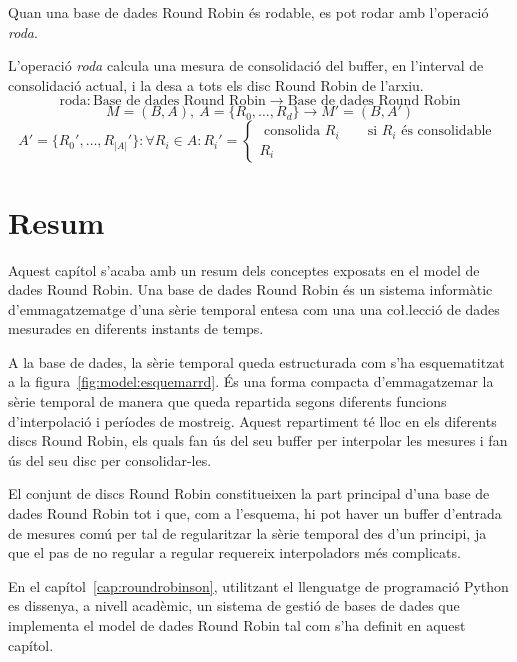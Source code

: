 {Quan una base de dades Round Robin és rodable, es pot rodar amb l'operació \emph{roda}. 
 
\begin{definition}
  L'operació \emph{roda} calcula una mesura de consolidació del
  buffer, en l'interval de consolidació actual, i la desa a tots els
  disc Round Robin de l'arxiu.
  \[
  \text{roda}: \text{Base de dades Round Robin} \longrightarrow
  \text{Base de dades Round Robin}
  \]
  \[
  M=(B,A),\ A = \{R_0,\ldots,R_d\} \longrightarrow M'= (B,A')
  \]
  \[
  A'= \{R_0',\ldots,R_{|A|}'\}: \forall R_i \in A: R_i' =
  \left\{ \begin{array}{l}
      \text{ consolida } R_i \qquad \text{si } R_i \text{ és consolidable }\\
      R_i
    \end{array} \right.
  \]
\end{definition}


\section{Resum}

Aquest capítol s'acaba amb un resum dels conceptes exposats en el model de dades Round Robin. Una base de dades Round Robin és un sistema informàtic d'emmagatzematge d'una sèrie temporal entesa com una  una co\l.lecció de dades mesurades en diferents instants de temps.

A la base de dades, la sèrie temporal queda estructurada com s'ha esquematitzat a  la figura~\ref{fig:model:esquemarrd}. És una forma compacta d'emmagatzemar la sèrie temporal de manera que queda repartida segons diferents funcions d'interpolació i períodes de mostreig. Aquest repartiment té lloc en els diferents discs Round Robin, els quals fan ús del seu buffer per interpolar les mesures i fan ús del seu disc per consolidar-les. 

El conjunt de discs Round Robin constitueixen la part principal d'una base de dades Round Robin tot i que, com a l'esquema, hi pot haver un buffer d'entrada de mesures comú per tal de regularitzar la sèrie temporal des d'un principi, ja que el pas de no regular a regular requereix interpoladors més complicats.


En el capítol~\ref{cap:roundrobinson}, utilitzant el llenguatge de programació Python es dissenya, a nivell acadèmic, un sistema de gestió de bases de dades que implementa el model de dades Round Robin tal com s'ha definit en aquest capítol.


}
